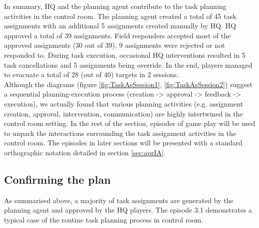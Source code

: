 In summary, HQ and the planning agent contribute to the task planning activities in the control room. The planning agent created a total of 45 task assignments with an additional 5 assignments created manually by HQ. HQ approved a total of 39 assignments. Field responders accepted most of the approved assignments (30 out of 39). 9 assignments were rejected or not responded to. During task execution, occasional HQ interventions resulted in 5 task cancellations and 5 assignments being override. In the end, players managed to evacuate a total of 28 (out of 40) targets in 2 sessions.\\ 

Although the diagrams (figure \ref{fig:TaskAsSession1}, \ref{fig:TaskAsSession2}) suggest a sequential planning-execution process (creation -> approval -> feedback -> execution), we actually found that various planning activities (e.g. assignment creation, approval, intervention, communication) are highly intertwined in the control room setting. In the rest of the section, episodes of game play will be used to unpack the interactions surrounding the task assignment activities in the control room. The episodes in later sections will be presented with a standard orthographic notation detailed in section \ref{sec:aprIA}.\\

\subsection{Confirming the plan}
As summarised above, a majority of task assignments are generated by the planning agent and approved by the HQ players. The episode 3.1 demonstrates a typical case of the routine task planning process in control room. \\

